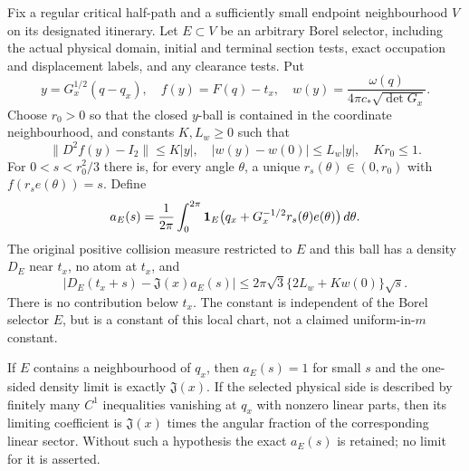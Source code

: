\begin{theorem}
\label{thm:cr-critical-density}
Fix a regular critical half-path and a sufficiently small endpoint
neighbourhood $V$ on its designated itinerary. Let $E\subset V$ be
an arbitrary Borel selector, including the actual physical domain,
initial and terminal section tests, exact occupation and displacement
labels, and any clearance tests. Put
\[
 y=G_x^{1/2}(q-q_x),\quad f(y)=F(q)-t_x,\quad
 w(y)=\frac{\omega(q)}{4\pi c_*\sqrt{\det G_x}}.
\]
Choose $r_0>0$ so that the closed $y$-ball is contained in the
coordinate neighbourhood, and constants $K,L_w\ge0$ such that
\[
 \|D^2 f(y)-I_2\|\le K|y|,\quad
 |w(y)-w(0)|\le L_w|y|,\quad Kr_0\le1.
\]
For $0<s<r_0^2/3$ there is, for every angle $\theta$, a unique
$r_s(\theta)\in(0,r_0)$ with $f(r_s e(\theta))=s$. Define
\[
 a_E(s)=\frac{1}{2\pi}\int_0^{2\pi}
     \mathbf1_E\bigl(q_x+G_x^{-1/2}r_s(\theta)e(\theta)\bigr)\,d\theta.
\]
The original positive collision measure restricted to $E$ and this
ball has a density $D_E$ near $t_x$, no atom at $t_x$, and
\begin{equation}\label{eq:cr-sector}
 \left|D_E(t_x+s)-\mathfrak J(x)a_E(s)\right|
 \le 2\pi\sqrt3\{2L_w+Kw(0)\}\sqrt{s}.
\end{equation}
There is no contribution below $t_x$. The constant is independent
of the Borel selector $E$, but is a constant of this local chart,
not a claimed uniform-in-$m$ constant.

If $E$ contains a neighbourhood of $q_x$, then $a_E(s)=1$ for
small $s$ and the one-sided density limit is exactly
$\mathfrak J(x)$. If the selected physical side is described by
finitely many $C^1$ inequalities vanishing at $q_x$ with nonzero
linear parts, then its limiting coefficient is
$\mathfrak J(x)$ times the angular fraction of the corresponding
linear sector. Without such a hypothesis the exact $a_E(s)$ is
retained; no limit for it is asserted.
\end{theorem}
